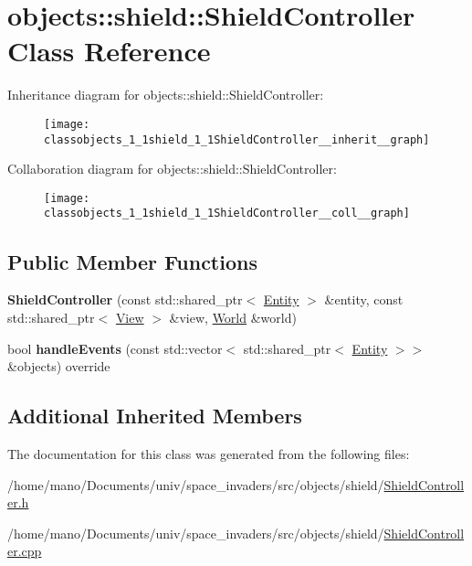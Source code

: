 \hypertarget{classobjects_1_1shield_1_1ShieldController}{}\section{objects\+:\+:shield\+:\+:Shield\+Controller Class Reference}
\label{classobjects_1_1shield_1_1ShieldController}


Inheritance diagram for objects\+:\+:shield\+:\+:Shield\+Controller\+:\nopagebreak
\begin{figure}[H]
\begin{center}
\leavevmode
\texttt{[image: classobjects\_1\_1shield\_1\_1ShieldController\_\_inherit\_\_graph]}
\end{center}
\end{figure}


Collaboration diagram for objects\+:\+:shield\+:\+:Shield\+Controller\+:\nopagebreak
\begin{figure}[H]
\begin{center}
\leavevmode
\texttt{[image: classobjects\_1\_1shield\_1\_1ShieldController\_\_coll\_\_graph]}
\end{center}
\end{figure}
\subsection*{Public Member Functions}
\begin{DoxyCompactItemize}
\item 
\mbox{\label{classobjects_1_1shield_1_1ShieldController_a91b1b04f46545a50201c14bd1fbda530}}
{\bfseries Shield\+Controller} (const std\+::shared\+\_\+ptr$<$ \hyperlink{classobjects_1_1Entity}{Entity} $>$ \&entity, const std\+::shared\+\_\+ptr$<$ \hyperlink{classobjects_1_1View}{View} $>$ \&view, \hyperlink{classWorld}{World} \&world)
\item 
\mbox{\label{classobjects_1_1shield_1_1ShieldController_a0c1bacca0231a39a1614147f65437987}}
bool {\bfseries handle\+Events} (const std\+::vector$<$ std\+::shared\+\_\+ptr$<$ \hyperlink{classobjects_1_1Entity}{Entity} $>$$>$ \&objects) override
\end{DoxyCompactItemize}
\subsection*{Additional Inherited Members}


The documentation for this class was generated from the following files\+:\begin{DoxyCompactItemize}
\item 
/home/mano/\+Documents/univ/space\+\_\+invaders/src/objects/shield/\hyperlink{ShieldController_8h}{Shield\+Controller.\+h}\item
/home/mano/\+Documents/univ/space\+\_\+invaders/src/objects/shield/\hyperlink{ShieldController_8cpp}{Shield\+Controller.\+cpp}\end{DoxyCompactItemize}
